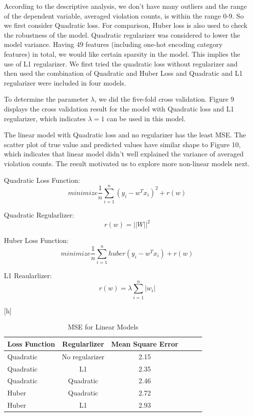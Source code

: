\documentclass[letterpaper, 11 pt, conference]{ieeeconf}
\begin{document}
According to the descriptive analysis, we don't have many outliers and the range of the dependent variable, averaged violation counts, is within the range 0-9. So we first consider Quadratic loss. For comparison, Huber loss is also used to check the robustness of the model. Quadratic regularizer was considered to lower the model variance. Having 49 features (including one-hot encoding category features) in total, we would like certain sparsity in the model. This implies the use of L1 regularizer. We first tried the quadratic loss without regularizer and then used the combination of Quadratic and Huber Loss and Quadratic and L1 regularizer were included in four models. 

To determine the parameter $\lambda$, we did the five-fold cross validation. Figure 9 displays the cross validation result for the model with Quadratic loss and L1 regularizer, which indicates $\lambda = 1$ can be used in this model.

The linear model with Quadratic loss and no regularizer has the least MSE. The scatter plot of true value and predicted values have similar shape to Figure 10, which indicates that linear model didn't well explained the variance of averaged violation counts. The result motivated us to explore more non-linear models next.

Quadratic Loss Function: \[ minimize\frac{1}{n}\sum_{i=1}^{n}  (y_i- w^T x_i)^2 +  r(w)\]

Quadratic Regularlizer: \[r(w) = ||W||^2 \]

Huber Loss Function: \[ minimize\frac{1}{n}\sum_{i=1}^{n} huber  (y_i- w^T x_i) +  r(w)\]

L1 Reaularlizer: \[  r(w) = \lambda \sum_{i=1}^{n}|w_i|\]
\begin{table} [h]
\caption {MSE for Linear Models}
\begin{center}[h]
	\tiny
	\begin{tabular}{l*{4}{c}r}
    \hline
	Loss Function & Regularlizer & Mean Square Error \\
    \hline
    Quadratic & No regularizer  & 2.15  \\ 
    Quadratic & L1  & 2.35  \\ 
 	Quadratic & Quadratic  & 2.46  \\  
 	Huber  & Quadratic  & 2.72  \\   
 	Huber  & L1  & 2.93  \\ 
    \hline
	\end{tabular}
\end{center}
\end{table}
\end{document}
